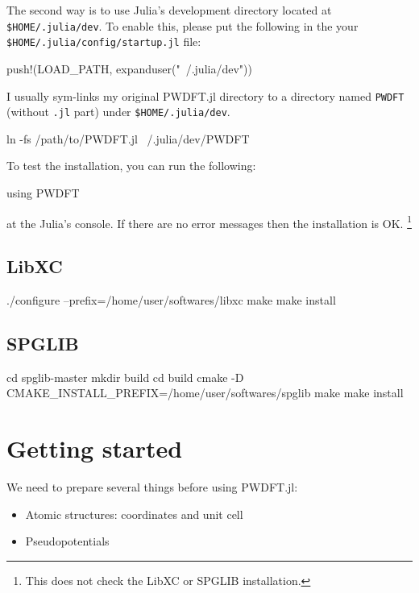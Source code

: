 \documentclass[a4paper,10pt]{paper}
\begin{document}
The second way is to use Julia's development directory located at
\texttt{\$HOME/.julia/dev}.
To enable this, please put the following in the
your \texttt{\$HOME/.julia/config/startup.jl} file:
\begin{juliacode}
push!(LOAD_PATH, expanduser("~/.julia/dev"))
\end{juliacode}
I usually sym-links my original \textsf{PWDFT.jl} directory
to a directory named \texttt{PWDFT} (without \texttt{.jl} part)
under \texttt{\$HOME/.julia/dev}.
\begin{textcode}
ln -fs /path/to/PWDFT.jl ~/.julia/dev/PWDFT
\end{textcode}

To test the installation, you can run the following:
\begin{juliacode}
using PWDFT
\end{juliacode}
at the Julia's console.
If there are no error messages then the installation is OK.
\footnote{This does not check the LibXC or SPGLIB installation.}

\subsection{LibXC}

\begin{textcode}
./configure --prefix=/home/user/softwares/libxc
make
make install
\end{textcode}

\subsection{SPGLIB}

\begin{textcode}
cd spglib-master
mkdir build
cd build
cmake -D CMAKE_INSTALL_PREFIX=/home/user/softwares/spglib
make
make install
\end{textcode}


\section{Getting started}

We need to prepare several things before using \textsf{PWDFT.jl}:
\begin{itemize}
\item Atomic structures: coordinates and unit cell
\item Pseudopotentials
\end{itemize}
\end{document}
